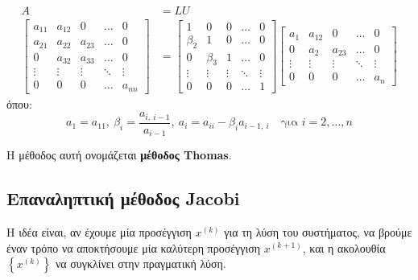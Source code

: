 \documentclass[11pt,a4paper,notitlepage,fleqn]{article}
\begin{document}
\paragraph{}
\begin{align*}
	A &= L U \\
	\left[\begin{matrix}
	a_{11}&a_{12}&0&\hdots & 0\\
	a_{21}&a_{22}&a_{23}&\hdots&0\\
	0&a_{32}&a_{33}&\hdots & 0 \\
	\vdots & \vdots & \vdots & \ddots & \vdots \\
	0&0&0&\hdots & a_{nn}
	\end{matrix}\right] &=
	\left[\begin{matrix}
	1&0&0&\hdots&0\\
	\beta_2&1&0&\hdots&0\\
	0&\beta_3&1&\hdots&0\\
	\vdots&\vdots&\vdots&\ddots&\vdots\\
	0&0&0&\hdots&1
	\end{matrix}\right]\left[\begin{matrix}
	a_1 & a_{12} & 0 & \hdots & 0 \\
	0 & a_2 & a_{23} & \hdots & 0 \\
	\vdots & \vdots &\vdots &\ddots&\vdots \\
	0 & 0 & 0 & \hdots & a_n
	\end{matrix}\right]
\end{align*}
όπου:
\[
a_1=a_{11},\ \beta_i=\frac{a_{i,\ i-1}}{a_{i-1}},\
a_i=a_{ii}-\beta_{i}a_{i-1,\ i}
\quad \text{για } i =2,\dots,n
\]

Η μέθοδος αυτή ονομάζεται \textbf{μέθοδος Thomas}.

\subsection{Επαναληπτική μέθοδος Jacobi}

Η ιδέα είναι, αν έχουμε μία προσέγγιση \( x^{(k)} \) για τη
λύση του συστήματος, να βρούμε έναν τρόπο να αποκτήσουμε μία
καλύτερη προσέγγιση \( x^{(k+1)} \), και η ακολουθία
\( \left\lbrace x^{(k)} \right\rbrace \) να συγκλίνει στην
πραγματική λύση.
\end{document}
